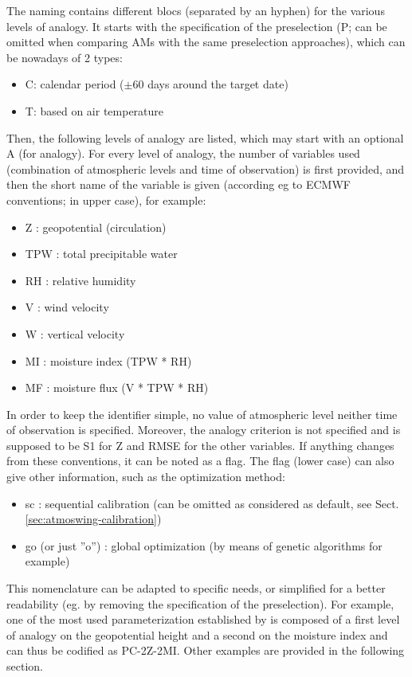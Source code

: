 \documentclass[review]{elsarticle}
\begin{document}
The naming contains different blocs (separated by an hyphen) for the various levels of analogy. It starts with the specification of the preselection (P; can be omitted when comparing AMs with the same preselection approaches), which can be nowadays of 2 types:
\begin{itemize}
	\setlength\itemsep{-2px}
	\item C: calendar period ($\pm 60$ days around the target date)
	\item T: based on air temperature \citep{BenDaoud2010}
\end{itemize}

Then, the following levels of analogy are listed, which may start with an optional A (for analogy). For every level of analogy, the number of variables used (combination of atmospheric levels and time of observation) is first provided, and then the short name of the variable is given (according eg to ECMWF conventions; in upper case), for example:
\begin{itemize}
	\setlength\itemsep{-2px}
	\item Z : geopotential (circulation)
	\item TPW : total precipitable water
	\item RH : relative humidity
	\item V : wind velocity
	\item W : vertical velocity
	\item MI : moisture index (TPW * RH)
	\item MF : moisture flux (V * TPW * RH)
\end{itemize}

In order to keep the identifier simple, no value of atmospheric level neither time of observation is specified. Moreover, the analogy criterion is not specified and is supposed to be S1 for Z and RMSE for the other variables. If anything changes from these conventions, it can be noted as a flag. The flag (lower case) can also give other information, such as the optimization method:
\begin{itemize}
	\setlength\itemsep{-2px}
	\item sc : sequential calibration (can be omitted as considered as default, see Sect. \ref{sec:atmoswing-calibration})
	\item go (or just ''o'') : global optimization (by means of genetic algorithms for example)
\end{itemize}

This nomenclature can be adapted to specific needs, or simplified for a better readability (eg. by removing the specification of the preselection). For example, one of the most used parameterization established by \citet{Bontron2004} is composed of a first level of analogy on the geopotential height and a second on the moisture index and can thus be codified as PC-2Z-2MI. Other examples are provided in the following section.
\end{document}
